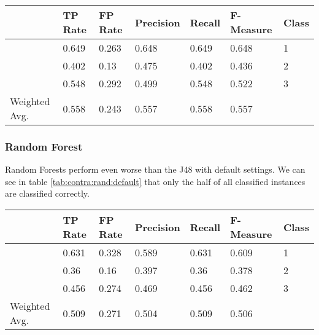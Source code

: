 \documentclass[paper=a4, fontsize=11pt]{scrartcl} %
\numberwithin{equation}{section} %
\numberwithin{figure}{section} %
\numberwithin{table}{section} %
\begin{document}
 
\begin{table*}[htb]\centering
  \begin{tabular*}{\columnwidth}{@{}lllllll@{}}
      \toprule 
               &  TP Rate & FP Rate & Precision & Recall & F-Measure &  Class \\ \midrule   
               &  0.649   & 0.263   & 0.648     & 0.649  & 0.648     &  1     \\    
               &  0.402   & 0.13    & 0.475     & 0.402  & 0.436     &  2     \\        
               &  0.548   & 0.292   & 0.499     & 0.548  & 0.522     &  3     \\    
Weighted Avg.  &  0.558   & 0.243   & 0.557     & 0.558  & 0.557     &        \\ \bottomrule 
    \end{tabular*}
\caption{Decision Tree on Contraceptive Data Set -- using binary splits} 
\label{tab:contra:dec:bin}
\end{table*}
\FloatBarrier

\subsubsection{Random Forest}
Random Forests perform even worse than the J48 with default settings. We can see in table \ref{tab:contra:rand:default} that only the half of all classified instances are classified correctly.

\begin{table*}[htb]\centering
  \begin{tabular*}{\columnwidth}{@{}lllllll@{}}
      \toprule 
               &  TP Rate & FP Rate & Precision & Recall & F-Measure  & Class  \\  \midrule      
               &  0.631   & 0.328   & 0.589     & 0.631  & 0.609      & 1      \\       
               &  0.36    & 0.16    & 0.397     & 0.36   & 0.378      & 2      \\       
               &  0.456   & 0.274   & 0.469     & 0.456  & 0.462      & 3      \\       
Weighted Avg.  &  0.509   & 0.271   & 0.504     & 0.509  & 0.506      &        \\  \bottomrule     
    \end{tabular*}
\caption{Random Forests on Contraceptive Data Set -- Default Settings} 
\label{tab:contra:rand:default}
\end{table*}
\FloatBarrier
\end{document}

